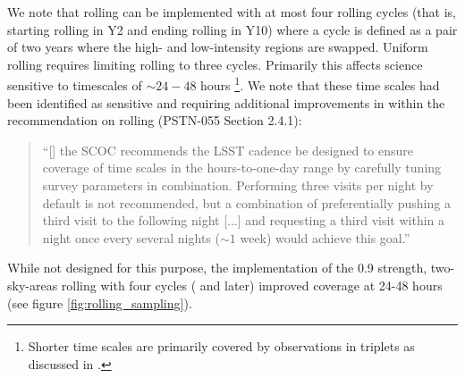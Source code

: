 We note that rolling can be implemented with at most four rolling cycles (that is, starting rolling in Y2 and ending rolling in Y10) where a cycle is defined as a pair of two years where the high- and low-intensity regions are swapped. Uniform rolling requires limiting rolling to three cycles. Primarily this affects science sensitive to timescales of $\sim24-48$ hours \footnote{Shorter time scales are primarily covered by observations in triplets as discussed in .}. 
We note that these time scales had been identified as sensitive and requiring additional improvements in  within the recommendation on rolling (PSTN-055 Section 2.4.1): 

\begin{quote}
``[] the SCOC recommends the LSST cadence
be designed to ensure coverage of time scales in the hours-to-one-day range by carefully tuning survey parameters in combination. Performing three visits per night by default is not recommended, but a combination of preferentially pushing a third visit to the following night [...] and requesting a third visit within a night once every several nights ($\sim 1$ week) would achieve this goal.'' 
\end{quote}

While not designed for this purpose, the implementation of the 0.9 strength, two-sky-areas rolling with four cycles ( and later) improved coverage at 24-48 hours (see figure \autoref{fig:rolling_sampling}).


